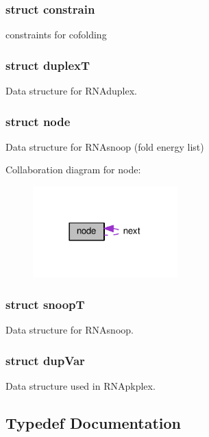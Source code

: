 \subsubsection{struct constrain}
constraints for cofolding \label{structduplexT}
\hypertarget{group__data__structures_structduplexT}{}
\subsubsection{struct duplexT}
Data structure for R\+N\+Aduplex. \label{structnode}
\hypertarget{group__data__structures_structnode}{}
\subsubsection{struct node}
Data structure for R\+N\+Asnoop (fold energy list) 

Collaboration diagram for node\+:
\nopagebreak
\begin{figure}[H]
\begin{center}
\leavevmode
\includegraphics[width=158pt]{structnode__coll__graph}
\end{center}
\end{figure}
\label{structsnoopT}
\hypertarget{group__data__structures_structsnoopT}{}
\subsubsection{struct snoopT}
Data structure for R\+N\+Asnoop. \label{structdupVar}
\hypertarget{group__data__structures_structdupVar}{}
\subsubsection{struct dup\+Var}
Data structure used in R\+N\+Apkplex. 

\subsection{Typedef Documentation}
